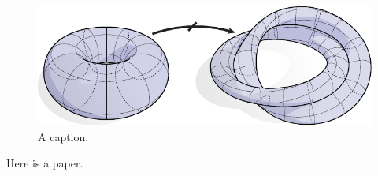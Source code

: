\documentclass[acmtog, authorversion]{acmart}
\begin{document}
\maketitle

\begin{figure}
   \centering
   \includegraphics[width=\columnwidth]{images/teaser.pdf}
   \caption{A caption.\label{fig:teaser}}
\end{figure}

Here is a paper.~\cite{reid:scribe}




\end{document}
